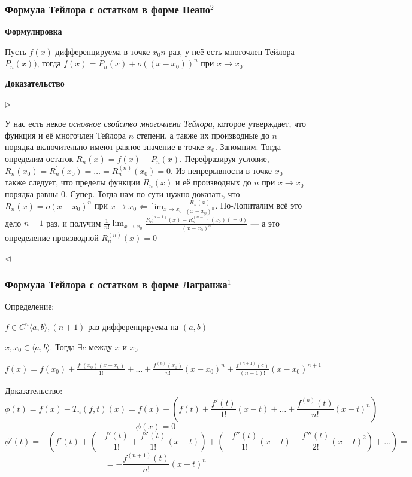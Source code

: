\documentclass{article}
\begin{document}
\subsubsection{Формула Тейлора с остатком в форме Пеано\texorpdfstring{$^2$}{}}

\textbf{Формулировка}

Пусть $f(x)$ дифференцируема в точке $x_0 n$ раз, у неё есть многочлен Тейлора $P_n(x))$, тогда $f(x) = P_n(x) + o((x - x_0))^n$ при $x \rightarrow x_0$.

\textbf{Доказательство}

$\rhd$

У нас есть некое \textit{основное свойство многочлена Тейлора}, которое утверждает, что функция и её многочлен Тейлора $n$ степени, а также их производные до $n$ порядка включительно имеют равное значение в точке $x_0$. Запомним. Тогда определим остаток $R_n(x) = f(x) - P_n(x)$. Перефразируя условие, $R_n(x_0) = R_n^\prime(x_0) = \ldots = R_n^{(n)}(x_0) = 0$. Из непрерывности в точке $x_0$ также следует, что пределы функции $R_n(x)$ и её производных до $n$ при $x \rightarrow x_0$ порядка равны 0. Супер. Тогда нам по сути нужно доказать, что $R_n(x) = o(x - x_0)^n$ при $x \rightarrow x_0 \Leftarrow \lim_{x \rightarrow x_0}\frac{R_n(x)}{(x - x_0)^n}$. По-Лопиталим всё это дело $n - 1$ раз, и получим $\frac{1}{n!}\lim_{x \rightarrow x_0}\frac{R_n^{(n - 1)}(x) - R_n^{(n - 1)}(x_0) (= 0)}{(x - x_0)^n}$ --- а это определение производной $R_n^{(n)}(x) = 0$

$\lhd$

\subsubsection{Формула Тейлора с остатком в форме Лагранжа\texorpdfstring{$^1$}{}}
Определение:

$f \in C^n\langle a, b\rangle, (n+1)$ раз дифференцируема на $(a, b)$

$x, x_0 \in \langle a, b\rangle$. Тогда $\exists c$ между $x$ и $x_0$

$f(x) = f(x_0) + \frac{f'(x_0)(x-x_0)}{1!} + \ldots + \frac{f^{(n)} (x_0)}{n!} (x-x_0)^n + \frac{f^{(n+1)} (c)}{(n+1)!}(x-x_0)^{n+1}$

Доказательство:
$$
\phi(t) = f (x) - T_n(f, t)(x) = f(x) - \left(f(t) + \frac{f'(t)}{1!}(x-t) + \ldots + \frac{f^{(n)}(t)}{n!}(x-t)^n\right)
$$
$$
\phi(x) = 0 
$$
$$
\phi'(t) = -\left(f'(t)+\left(-\frac{f'(t)}{1!}+\frac{f''(t)}{1!}(x-t)\right)+\left(-\frac{f''(t)}{1!}(x-t)+\frac{f'''(t)}{2!}(x-t)^2\right) + \ldots\right) =
$$
$$
=-\frac{f^{(n+1)}(t)}{n!}(x-t)^n
$$
\end{document}
